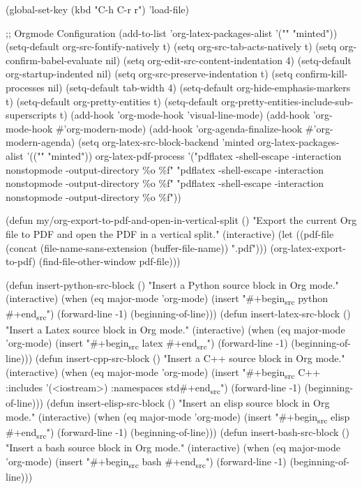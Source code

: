 \documentclass[11pt]{article}
\begin{document}
(global-set-key (kbd "C-h C-r r") 'load-file)

;; Orgmode Configuration
(add-to-list 'org-latex-packages-alist '("" "minted"))
(setq-default org-src-fontify-natively t)
(setq org-src-tab-acts-natively t)
(setq org-confirm-babel-evaluate nil)
(setq org-edit-src-content-indentation 4)
(setq-default org-startup-indented nil)
(setq org-src-preserve-indentation t)
(setq confirm-kill-processes nil)
(setq-default tab-width 4)
(setq-default org-hide-emphasis-markers t)
(setq-default org-pretty-entities t)
(setq-default org-pretty-entities-include-sub-superscripts t)
(add-hook 'org-mode-hook 'visual-line-mode)
(add-hook 'org-mode-hook \#'org-modern-mode)
(add-hook 'org-agenda-finalize-hook \#'org-modern-agenda)
(setq org-latex-src-block-backend 'minted
      org-latex-packages-alist '(("" "minted"))
      org-latex-pdf-process
      '("pdflatex -shell-escape -interaction nonstopmode -output-directory \%o \%f"
        "pdflatex -shell-escape -interaction nonstopmode -output-directory \%o \%f"
        "pdflatex -shell-escape -interaction nonstopmode -output-directory \%o \%f"))


(defun my/org-export-to-pdf-and-open-in-vertical-split ()
  "Export the current Org file to PDF and open the PDF in a vertical split."
  (interactive)
  (let ((pdf-file (concat (file-name-sans-extension (buffer-file-name)) ".pdf")))
    (org-latex-export-to-pdf)
    (find-file-other-window pdf-file)))

(defun insert-python-src-block ()
  "Insert a Python source block in Org mode."
  (interactive)
  (when (eq major-mode 'org-mode)
    (insert "\#+begin\textsubscript{src} python \n\n\#+end\textsubscript{src}")
    (forward-line -1)
    (beginning-of-line)))
(defun insert-latex-src-block ()
  "Insert a Latex source block in Org mode."
  (interactive)
  (when (eq major-mode 'org-mode)
    (insert "\#+begin\textsubscript{src} latex \n\n\#+end\textsubscript{src}")
    (forward-line -1)
    (beginning-of-line)))
(defun insert-cpp-src-block ()
  "Insert a C++ source block in Org mode."
  (interactive)
  (when (eq major-mode 'org-mode)
    (insert "\#+begin\textsubscript{src} C++ :includes '(<iostream>) :namespaces std\n\n\#+end\textsubscript{src}")
    (forward-line -1)
    (beginning-of-line)))
(defun insert-elisp-src-block ()
  "Insert an elisp source block in Org mode."
  (interactive)
  (when (eq major-mode 'org-mode)
    (insert "\#+begin\textsubscript{src} elisp \n\n\#+end\textsubscript{src}")
    (forward-line -1)
    (beginning-of-line)))
(defun insert-bash-src-block ()
  "Insert a bash source block in Org mode."
  (interactive)
  (when (eq major-mode 'org-mode)
    (insert "\#+begin\textsubscript{src} bash \n\n\#+end\textsubscript{src}")
    (forward-line -1)
    (beginning-of-line)))
\end{document}
